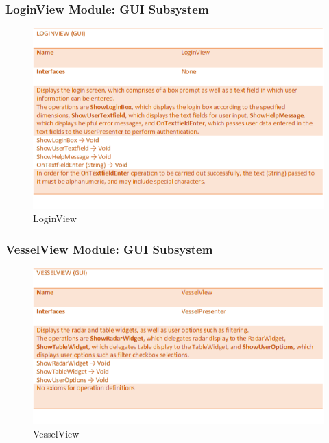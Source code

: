\documentclass[12pt]{article}
\begin{document}
\subsubsection{LoginView Module: GUI Subsystem}
\begin{figure}[h!]
    \centering
    \includegraphics[scale=0.9]{2_2_1_loginview_(gui)}
    \caption{LoginView}
\end{figure}
\clearpage

\subsubsection{VesselView Module: GUI Subsystem}
\begin{figure}[h!]
    \centering
    \includegraphics[scale=0.9]{2_2_2_vesselview_(gui)}
    \caption{VesselView}
\end{figure}
\end{document}
